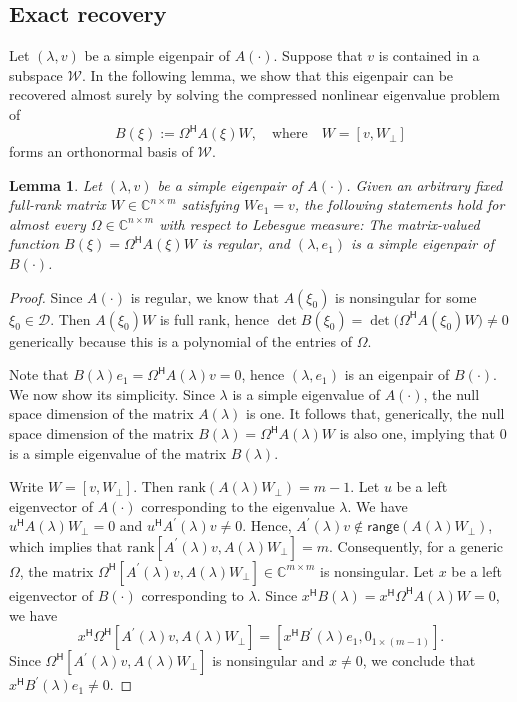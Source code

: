 \documentclass[a4paper,11pt]{article}
\newtheorem{lemma}{Lemma}
\newcommand{\Htran}{\mathsf{H}}
\newcommand{\defi}{:=}
\newcommand{\C}{\mathbb{C}}
\newcommand{\rk}{\mathrm{rank}}
\newcommand{\region}{\mathcal{D}}
\newcommand{\range}{\mathsf{range}}
\begin{document}
\subsection{Exact recovery}
Let $(\lambda,v)$ be a simple eigenpair of $A(\cdot)$. Suppose that $v$ is contained in a subspace $\mathcal{W}$. In the following lemma, we show that this eigenpair can be recovered almost surely by solving the compressed nonlinear eigenvalue problem of 
\begin{equation}
    \label{eq:defB}
    B(\xi) \defi \Omega^{\Htran} A(\xi)W, 
    \quad \text{where}\quad  W=[v,W_{\perp}]
\end{equation}
forms an orthonormal basis of $\mathcal{W}$. 
\begin{lemma}
    \label{lem:exact}
    Let $(\lambda,v)$ be a simple eigenpair of $A(\cdot)$.  Given an arbitrary fixed full-rank matrix $W\in\C^{n\times m}$ satisfying $We_{1}=v$, the following statements hold for almost every $\Omega\in\C^{n\times m}$ with respect to Lebesgue measure:
    The matrix-valued function $B(\xi)=\Omega^{\Htran}A(\xi)W$ is regular, and $(\lambda,e_{1})$ is a simple eigenpair of $B(\cdot)$.
\end{lemma}
\begin{proof}
    Since $A(\cdot)$ is regular, we know that $A(\xi_{0})$ is nonsingular for some $\xi_{0}\in\region$. Then $A(\xi_{0})W$ is full rank, hence $\det B(\xi_{0}) = \det \bigl(\Omega^{\Htran}A(\xi_{0})W\bigr)\neq 0$ generically because this is a polynomial of the entries of $\Omega$.

Note that $B(\lambda)e_{1}=\Omega^{\Htran} A(\lambda)v=0$, hence $(\lambda,e_{1})$ is an eigenpair of $B(\cdot)$.
We now show its simplicity. Since $\lambda$ is a simple eigenvalue of $A(\cdot)$, the null space dimension of the matrix $A(\lambda)$ is one. It follows that, generically, the null space dimension of the matrix $B(\lambda)=\Omega^{\Htran}A(\lambda)W$ is also one, implying that $0$ is a simple eigenvalue of the matrix $B(\lambda)$.

Write $W=[v,W_{\perp}]$. Then $\rk(A(\lambda)W_{\perp})=m-1$. Let $u$ be a left eigenvector of $A(\cdot)$ corresponding to the eigenvalue $\lambda$. We have $u^{\Htran}A(\lambda)W_{\perp}=0$ and $u^{\Htran}A^{\prime}(\lambda)v\neq 0$. Hence, $A^{\prime}(\lambda)v\notin\range(A(\lambda)W_{\perp})$, which implies that $\rk[A^{\prime}(\lambda)v,A(\lambda)W_{\perp}]=m$. Consequently, for a generic $\Omega$, the matrix $\Omega^{\Htran}[A^{\prime}(\lambda)v,A(\lambda)W_{\perp}]\in\C^{m\times m}$ is nonsingular.
Let $x$ be a left eigenvector of $B(\cdot)$ corresponding to $\lambda$. Since $x^{\Htran}B(\lambda)=x^{\Htran}\Omega^{\Htran}A(\lambda)W=0$, we have
\begin{equation}
    \label{eq:pfexact}
x^{\Htran}\Omega^{\Htran}[A^{\prime}(\lambda)v,A(\lambda)W_{\perp}]
=[x^{\Htran}B^{\prime}(\lambda)e_{1},0_{1\times(m-1)}].
\end{equation}
Since $\Omega^{\Htran}[A^{\prime}(\lambda)v,A(\lambda)W_{\perp}]$ is nonsingular and $x\neq 0$, we conclude that $x^{\Htran}B^{\prime}(\lambda)e_{1}\neq 0$.
\end{proof}
\end{document}
